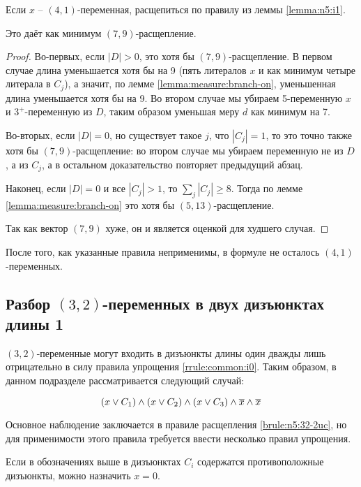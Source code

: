\begin{brule}
 Если $x$ -- $(4,1)$-переменная, расщепиться по правилу из леммы \ref{lemma:n5:i1}.

 Это даёт как минимум $(7,9)$-расщепление.
 \label{brule:n5:41}
\end{brule}

\begin{proof}
 Во-первых, если $|D| > 0$, это хотя бы $(7,9)$-расщепление. В первом случае длина уменьшается хотя бы на 9 (пять литералов $x$ и как минимум четыре литерала в $C_j$), а значит, по лемме \ref{lemma:measure:branch-on}, уменьшенная длина уменьшается хотя бы на 9. Во втором случае мы убираем 5-переменную $x$ и $3^+$-переменную из $D$, таким образом уменьшая меру $d$ как минимум на 7.

 Во-вторых, если $|D| = 0$, но существует такое $j$, что $|C_j| = 1$, то это точно также хотя бы $(7,9)$-расщепление: во втором случае мы убираем переменную не из $D$, а из $C_j$, а в остальном доказательство повторяет предыдущий абзац.

 Наконец, если $|D| = 0$ и все $|C_j| > 1$, то $\sum_j |C_j| \geq 8$. Тогда по лемме \ref{lemma:measure:branch-on} это хотя бы $(5,13)$-расщепление.

 Так как вектор $(7,9)$ хуже, он и является оценкой для худшего случая.
\end{proof}

После того, как указанные правила неприменимы, в формуле не осталось $(4,1)$-переменных.

\subsection{Разбор $(3,2)$-переменных в двух дизъюнктах длины 1}
\label{subsec:n5:32-3uc}

\firstpar{}$(3,2)$-переменные могут входить в дизъюнкты длины один дважды лишь отрицательно в силу правила упрощения \ref{rrule:common:i0}. Таким образом, в данном подразделе рассматривается следующий случай:

$$
 (x \vee C_1) \wedge (x \vee C_2) \wedge (x \vee C_3) \wedge \overline{x} \wedge \overline{x}
$$

Основное наблюдение заключается в правиле расщепления \ref{brule:n5:32-2uc}, но для применимости этого правила требуется ввести несколько правил упрощения.

\begin{rrule}
 Если в обозначениях выше в дизъюнктах $C_i$ содержатся противоположные дизъюнкты, можно назначить $x = 0$.
 \label{rrule:n5:32-2uc:compl}
\end{rrule}


